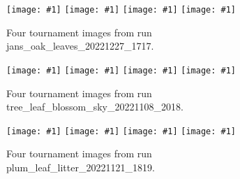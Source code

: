 \documentclass[acmtog]{acmart}
\newcommand{\igfour}[1]{\texttt{[image: \#1]}}
\begin{document}

\newpage






\begin{figure}
    \igfour{20221228_step_6662.png}
    \hfill
    \igfour{20221228_step_7095.png}
    \hfill
    \igfour{20221228_step_7574.png}
    \hfill
    \igfour{20221228_step_7742.png}
    \caption{Four tournament images from run jans\_oak\_leaves\_20221227\_1717.}
    \label{fig:jans_oak_leaves_4x}
\end{figure}



\begin{figure}
    \igfour{20221108_2018_step_4655.png}
    \hfill
    \igfour{20221108_2018_step_5498.png}
    \hfill
    \igfour{20221108_2018_step_5947.png}
    \hfill
    \igfour{20221108_2018_step_6562.png}
    \caption{Four tournament images from run tree\_leaf\_blossom\_sky\_20221108\_2018.}
    \label{fig:tree_leaf_blossom_sky_4x}
\end{figure}


\begin{figure}
    \igfour{20221121_1819_step_6324.png}
    \hfill
    \igfour{20221121_1819_step_6464.png}
    \hfill
    \igfour{20221121_1819_step_6677.png}
    \hfill
    \igfour{20221121_1819_step_6755.png}
    \caption{Four tournament images from run plum\_leaf\_litter\_20221121\_1819.}
    \label{fig:plum_leaf_litter_4x}
\end{figure}
\end{document}
